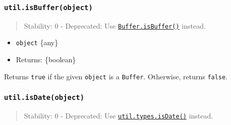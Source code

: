 \subsubsection{\texorpdfstring{\texttt{util.isBuffer(object)}}{util.isBuffer(object)}}\label{util.isbufferobject}

\begin{quote}
Stability: 0 - Deprecated: Use
\href{buffer.md\#static-method-bufferisbufferobj}{\texttt{Buffer.isBuffer()}}
instead.
\end{quote}

\begin{itemize}
\tightlist
\item
  \texttt{object} \{any\}
\item
  Returns: \{boolean\}
\end{itemize}

Returns \texttt{true} if the given \texttt{object} is a \texttt{Buffer}.
Otherwise, returns \texttt{false}.

\begin{Shaded}
\begin{Highlighting}[]
\OperatorTok{=} \NormalTok{(}\NormalTok{)}\OperatorTok{;}

\NormalTok{(\{ }\OperatorTok{:} \NormalTok{ \})}\OperatorTok{;}
\NormalTok{([])}\OperatorTok{;}
\NormalTok{(}\NormalTok{(}\NormalTok{))}\OperatorTok{;}
\end{Highlighting}
\end{Shaded}

\subsubsection{\texorpdfstring{\texttt{util.isDate(object)}}{util.isDate(object)}}\label{util.isdateobject}

\begin{quote}
Stability: 0 - Deprecated: Use
\hyperref[utiltypesisdatevalue]{\texttt{util.types.isDate()}} instead.
\end{quote}

